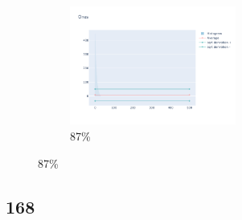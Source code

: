 \documentclass[12pt, fleqn]{report}                             %
\theoremstyle{break}                                            %
\begin{document}
\begin{figure}[ht!]
\begin{subfigure}[b]{0.4\linewidth}
          \includegraphics[width=0.6\textwidth]{Images/160/dia-d.png}
          \caption{87\%}
        \end{subfigure}
      \end{figure}


      \clearpage
      \subsection{168}
\end{document}
